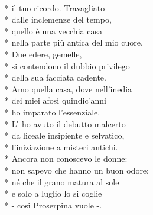 \documentclass[12pt]{book}
\begin{document}
\begin{poem}{}{}

\settowidth{\versewidth}{non meno è ciò che meriti.}

\begin{altverse}
\\*
il tuo ricordo. Travagliato\\*
dalle inclemenze del tempo,\\*
quello è una vecchia casa\\*
nella parte più antica del mio cuore.\\*
Due edere, gemelle,\\*
si contendono il dubbio privilego\\*
della sua facciata cadente.\\*
Amo quella casa, dove nell'inedia\\*
dei miei afosi quindic'anni\\*
ho imparato l'essenziale.\\*
Lì ho avuto il debutto malcerto\\*
da liceale insipiente e selvatico,\\*
l'iniziazione a misteri antichi.\\*
Ancora non conoscevo le donne:\\*
non sapevo che hanno un buon odore;\\*
né che il grano matura al sole\\*
e solo a luglio lo si coglie\\*
- così Proserpina vuole -.
\end{altverse}


\end{poem}
\end{document}
